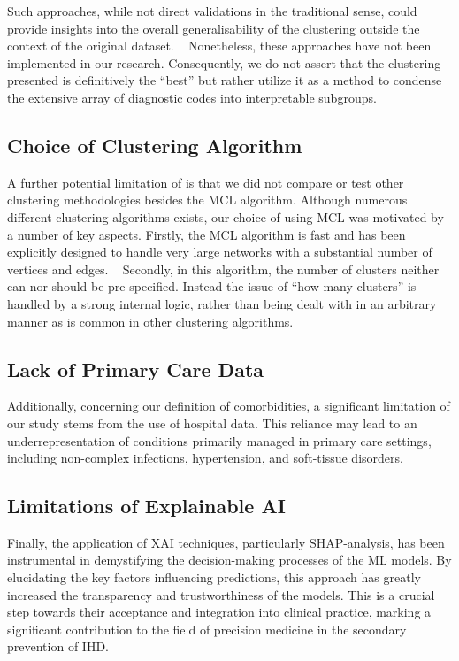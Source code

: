 Such approaches, while not direct validations in the traditional sense, 
could provide insights into the overall generalisability of the clustering 
outside the context of the original dataset.
~\autocite{ullmannValidation2022}
Nonetheless, these approaches have not been implemented in our research.
Consequently, we do not assert that the clustering presented is definitively
the \enquote{best} but rather utilize it as a method to condense the extensive
array of diagnostic codes into interpretable subgroups.

\subsection{Choice of Clustering Algorithm}

A further potential limitation of \studyi{} 
is that we did not compare or test other 
clustering methodologies besides the \ac{MCL} algorithm.
Although numerous different clustering algorithms exists,
our choice of using \ac{MCL} was motivated by a number of key aspects.
Firstly, the \ac{MCL} algorithm is fast and has been explicitly designed 
to handle very large networks with a substantial number of vertices
and edges.
~\autocite{vandongenGraph2008}
Secondly, in this algorithm,
the number of clusters neither can nor should be pre-specified.
Instead the issue of \enquote{how many clusters} is handled
by a strong internal logic, rather than being dealt with in an
arbitrary manner as is common in other clustering algorithms.
~\autocite{vandongenGraph2008}

\subsection{Lack of Primary Care Data}

Additionally, concerning our definition of comorbidities, a significant
limitation of our study stems from the use of hospital data. 
This reliance may
lead to an underrepresentation of conditions primarily managed in primary care
settings, including  non-complex infections, hypertension, and
soft-tissue disorders.
~\autocite{finleyWhat2018} 




\subsection{Limitations of Explainable AI}




Finally, the application of \ac{XAI} techniques, particularly
\ac{SHAP}-analysis, has been instrumental in demystifying the decision-making
processes of the \ac{ML} models. By elucidating the key factors influencing
predictions, this approach has greatly increased the transparency and
trustworthiness of the models. This is a crucial step towards their acceptance
and integration into clinical practice, marking a significant contribution to
the field of precision medicine in the secondary prevention of \ac{IHD}.


